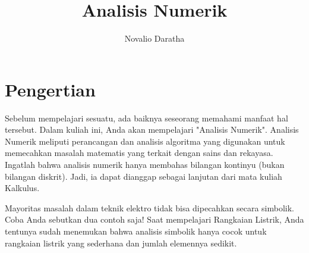 \documentclass[10pt,a4paper]{article}
\begin{document}
	\title{Analisis Numerik}
	\author{Novalio Daratha}
	\maketitle
	\section{Pengertian}
	
	Sebelum mempelajari sesuatu, ada baiknya seseorang memahami manfaat hal tersebut. Dalam kuliah ini, Anda akan mempelajari "Analisis Numerik". Analisis Numerik meliputi perancangan dan analisis algoritma yang digunakan untuk memecahkan masalah matematis yang terkait dengan sains dan rekayasa. Ingatlah bahwa analisis numerik hanya membahas bilangan kontinyu (bukan bilangan diskrit). Jadi, ia dapat dianggap sebagai lanjutan dari mata kuliah Kalkulus.
	
	
	Mayoritas masalah dalam teknik elektro tidak bisa dipecahkan secara simbolik. Coba Anda sebutkan dua contoh saja! Saat mempelajari Rangkaian Listrik, Anda tentunya sudah menemukan bahwa analisis simbolik hanya cocok untuk rangkaian listrik yang sederhana dan jumlah elemennya sedikit.
\end{document}
